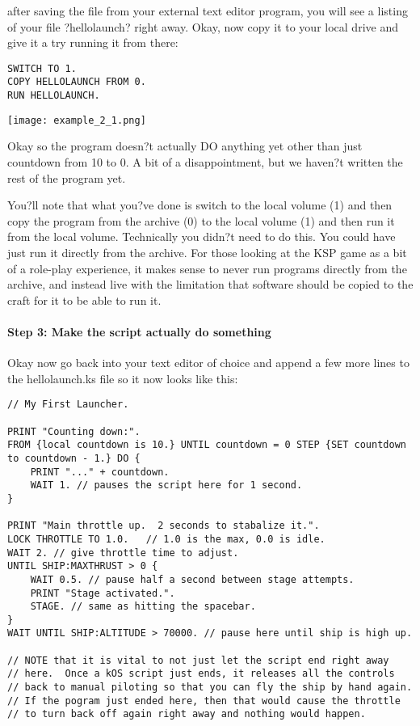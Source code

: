 after saving the file from your external text editor program, you will see a listing of your file ?hellolaunch? right away. Okay, now copy it to your local drive and give it a try running it from there:

\begin{Verbatim}[frame=single]
SWITCH TO 1.
COPY HELLOLAUNCH FROM 0.
RUN HELLOLAUNCH.
\end{Verbatim} 

\begin{center}
\texttt{[image: example\_2\_1.png]}
\end{center}

Okay so the program doesn?t actually DO anything yet other than just countdown from 10 to 0. A bit of a disappointment, but we haven?t written the rest of the program yet.

You?ll note that what you?ve done is switch to the local volume (1) and then copy the program from the archive (0) to the local volume (1) and then run it from the local volume. Technically you didn?t need to do this. You could have just run it directly from the archive. For those looking at the KSP game as a bit of a role-play experience, it makes sense to never run programs directly from the archive, and instead live with the limitation that software should be copied to the craft for it to be able to run it.

\paragraph{Step 3: Make the script actually do something}
Okay now go back into your text editor of choice and append a few more lines to the hellolaunch.ks file so it now looks like this:

\begin{Verbatim}[frame=single]
// My First Launcher.

PRINT "Counting down:".
FROM {local countdown is 10.} UNTIL countdown = 0 STEP {SET countdown to countdown - 1.} DO {
    PRINT "..." + countdown.
    WAIT 1. // pauses the script here for 1 second.
}

PRINT "Main throttle up.  2 seconds to stabalize it.".
LOCK THROTTLE TO 1.0.   // 1.0 is the max, 0.0 is idle.
WAIT 2. // give throttle time to adjust.
UNTIL SHIP:MAXTHRUST > 0 {
    WAIT 0.5. // pause half a second between stage attempts.
    PRINT "Stage activated.".
    STAGE. // same as hitting the spacebar.
}
WAIT UNTIL SHIP:ALTITUDE > 70000. // pause here until ship is high up.

// NOTE that it is vital to not just let the script end right away
// here.  Once a kOS script just ends, it releases all the controls
// back to manual piloting so that you can fly the ship by hand again.
// If the pogram just ended here, then that would cause the throttle
// to turn back off again right away and nothing would happen.
\end{Verbatim} 

